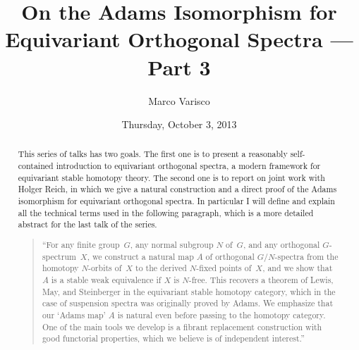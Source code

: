 \documentclass{UAmathtalk}
\author{Marco Varisco}
\title{On the Adams Isomorphism for Equivariant Orthogonal Spectra --- Part 3}
\date{Thursday, October 3, 2013}
\begin{document}
\maketitle

\begin{abstract}
This series of talks has two goals.
The first one is to present a reasonably self-contained introduction to equivariant orthogonal spectra, a modern framework for equivariant stable homotopy theory.
The second one is to report on joint work with Holger Reich, in which we give a natural construction and a direct proof of the Adams isomorphism for equivariant orthogonal spectra.
In particular I will define and explain all the technical terms used in the following paragraph, which is a more detailed abstract for the last talk of the series.
\begin{quote}
``For any finite group~$G$, any normal subgroup $N$ of~$G$, and any orthogonal $G$-spectrum~$X$, we construct a natural map $A$ of orthogonal $G/N$-spectra from the homotopy $N$-orbits of~$X$ to the derived $N$-fixed points of~$X$, and we show that $A$ is a stable weak equivalence if $X$ is $N$-free.  This recovers a theorem of Lewis, May, and Steinberger in the equivariant stable homotopy category, which in the case of suspension spectra was originally proved by Adams.  We emphasize that our `Adams map' $A$ is natural even before passing to the homotopy category.  One of the main tools we develop is a fibrant replacement construction with good functorial properties, which we believe is of independent interest.''
\end{quote}
\end{abstract}
\end{document}
